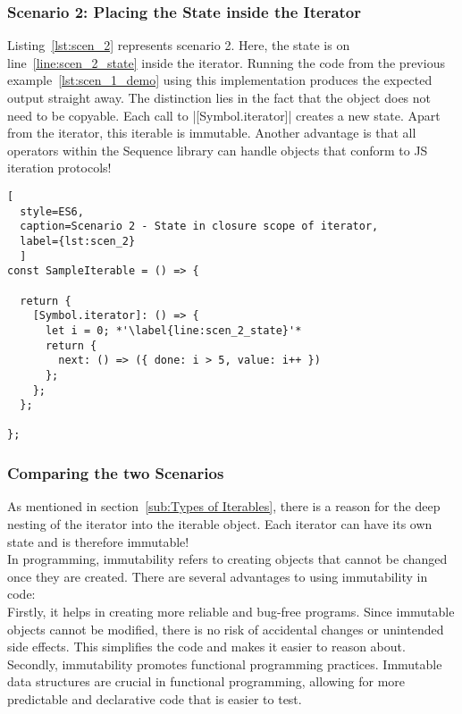 \subsubsection{Scenario 2: Placing the State inside the Iterator}
\label{subsub:Scenario 2}
Listing~\ref{lst:scen_2} represents scenario 2. Here, the state is on
line~\ref{line:scen_2_state} inside the iterator. Running the code from the
previous example~\ref{lst:scen_1_demo} using this implementation produces the
expected output straight away. The distinction lies in the fact that the object
does not need to be copyable. Each call to |[Symbol.iterator]| creates a new
state. Apart from the iterator, this iterable is immutable. Another advantage
is that all operators within the Sequence library can handle objects that
conform to JS iteration protocols!

\begin{lstlisting}[
  style=ES6, 
  caption=Scenario 2 - State in closure scope of iterator,
  label={lst:scen_2}
  ]
const SampleIterable = () => {

  return {
    [Symbol.iterator]: () => {
      let i = 0; *'\label{line:scen_2_state}'*
      return {
        next: () => ({ done: i > 5, value: i++ })
      };
    };
  };

};
\end{lstlisting}


\subsubsection{Comparing the two Scenarios}
\label{subsub:Comparing the Two Scenarios}
As mentioned in section~\ref{sub:Types of Iterables}, there is a reason for 
the deep nesting of the iterator into the iterable object. 
Each iterator can have its own state and is therefore immutable! \\
In programming, immutability refers to creating objects that cannot be changed
once they are created. There are several advantages to using immutability in
code: \\
Firstly, it helps in creating more reliable and bug-free programs. Since
immutable objects cannot be modified, there is no risk of accidental changes or
unintended side effects. This simplifies the code and makes it easier to reason
about. \\
Secondly, immutability promotes functional programming practices. Immutable
data structures are crucial in functional programming, allowing for more
predictable and declarative code that is easier to test.

